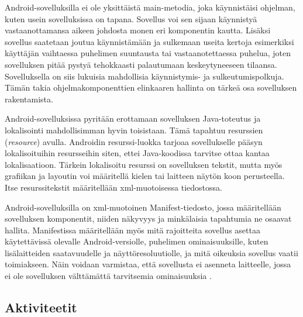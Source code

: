 Android-sovelluksilla ei ole yksittäistä main-metodia, joka käynnistäisi ohjelman, kuten usein sovelluksissa on tapana. Sovellus voi sen sijaan käynnistyä vastaanottamansa aikeen johdosta monen eri komponentin kautta. Lisäksi sovellus saatetaan joutua käynnistämään ja sulkemaan useita kertoja esimerkiksi käyttäjän vaihtaessa puhelimen suuntausta tai vastaanotettaessa puhelua, joten sovelluksen pitää pystyä tehokkaasti palautumaan keskeytyneeseen tilaansa. Sovelluksella on siis lukuisia mahdollisia käynnistymis- ja sulkeutumispolkuja. Tämän takia ohjelmakomponenttien elinkaaren hallinta on tärkeä osa sovelluksen rakentamista.

Android-sovelluksissa pyritään erottamaan sovelluksen Java-toteutus ja lokalisointi mahdollisimman hyvin toisistaan. Tämä tapahtuu resurssien (\emph{resource}) avulla. Androidin resurssi-luokka tarjoaa sovellukselle pääsyn lokalisoituihin resursseihin siten, ettei Java-koodissa tarvitse ottaa kantaa lokalisaatioon. Tärkein lokalisoitu resurssi on sovelluksen tekstit, mutta myös grafiikan ja layoutin voi määritellä kielen tai laitteen näytön koon perusteella. Itse resurssitekstit määritellään xml-muotoisessa tiedostossa.

Android-sovelluksilla on xml-muotoinen Manifest-tiedosto, jossa määritellään sovelluksen komponentit, niiden näkyvyys ja minkälaisia tapahtumia ne osaavat hallita. Manifestissa määritellään myös mitä rajoitteita sovellus asettaa käytettävissä olevalle Android-versiolle, puhelimen ominaisuuksille, kuten lisälaitteiden saatavuudelle ja näyttöresoluutiolle, ja mitä oikeuksia sovellus vaatii toimiakseen. Näin voidaan varmistaa, että sovellusta ei asenneta laitteelle, jossa ei ole sovelluksen välttämättä tarvitsemia ominaisuuksia \cite{android}.

\subsection{Aktiviteetit}

